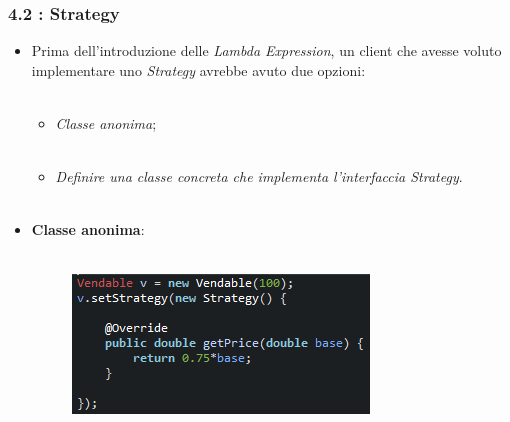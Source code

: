 \documentclass{beamer}
\begin{document}

\begin{frame}[fragile]
	\frametitle{\textbf{4.2 : Strategy}}
	\begin{itemize}
		\item
			Prima dell'introduzione delle \textit{Lambda Expression}, un client che avesse voluto implementare uno \textit{Strategy} avrebbe avuto due opzioni:\\\
			\begin{itemize}
				\item
					\textit{Classe anonima};\\\
				\item
					\textit{Definire una classe concreta che implementa l'interfaccia Strategy}.\\\
			\end{itemize}
		\item
			\textbf{Classe anonima}:\\\
			\begin{figure}
				\centering
				\includegraphics[width=0.6\linewidth]{image/strategyAnonima.png}
				\label{fig:target}
			\end{figure}
	\end{itemize}
\end{frame}

\end{document}
